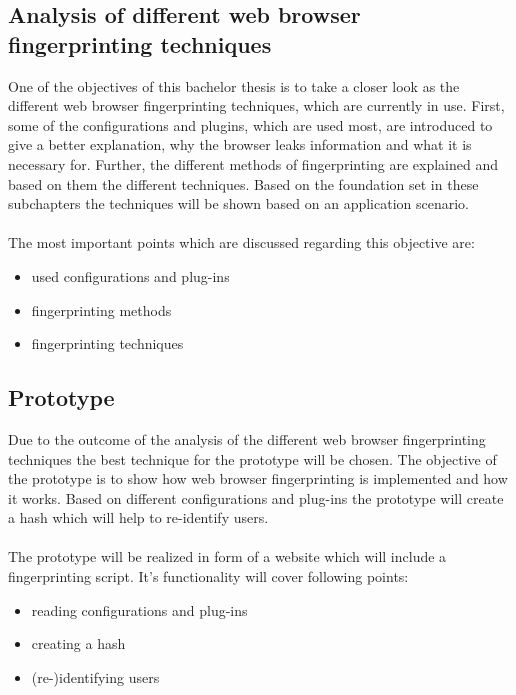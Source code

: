 \subsection{Analysis of different web browser fingerprinting techniques}
One of the objectives of this bachelor thesis is to take a closer look as the different web browser fingerprinting techniques, which are currently in use. 
First, some of the configurations and plugins, which are used most, are introduced to give a better explanation, why the browser leaks information and what it is necessary for. Further, the different methods of fingerprinting are explained and based on them the different techniques.
Based on the foundation set in these subchapters the techniques will be shown based on an application scenario. \\ 
\\
The most important points which are discussed regarding this objective are:
\begin{itemize}
	\item used configurations and plug-ins
	\item fingerprinting methods
	\item fingerprinting techniques
\end{itemize}

\subsection{Prototype}
Due to the outcome of the analysis of the different web browser fingerprinting techniques the best technique for the prototype will be chosen. The objective of the prototype is to show how web browser fingerprinting is implemented and how it works. Based on different configurations and plug-ins the prototype will create a hash which will help to re-identify users.\\\\
The prototype will be realized in form of a website which will include a fingerprinting script. It's functionality will cover following points:
\begin{itemize}
	\item reading configurations and plug-ins
	\item creating a hash
	\item (re-)identifying users
\end{itemize}

